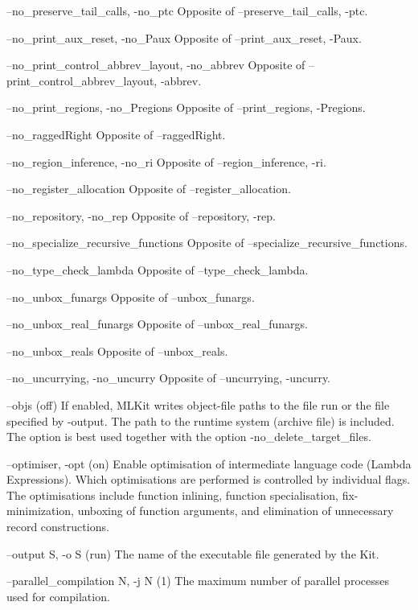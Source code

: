 \documentclass[12pt]{book}
\begin{document}
\begin{scriptcode}
--no_preserve_tail_calls, -no_ptc
     Opposite of --preserve_tail_calls, -ptc.

--no_print_aux_reset, -no_Paux
     Opposite of --print_aux_reset, -Paux.

--no_print_control_abbrev_layout, -no_abbrev
     Opposite of --print_control_abbrev_layout, -abbrev.

--no_print_regions, -no_Pregions
     Opposite of --print_regions, -Pregions.

--no_raggedRight
     Opposite of --raggedRight.

--no_region_inference, -no_ri
     Opposite of --region_inference, -ri.

--no_register_allocation
     Opposite of --register_allocation.

--no_repository, -no_rep
     Opposite of --repository, -rep.

--no_specialize_recursive_functions
     Opposite of --specialize_recursive_functions.

--no_type_check_lambda
     Opposite of --type_check_lambda.

--no_unbox_funargs
     Opposite of --unbox_funargs.

--no_unbox_real_funargs
     Opposite of --unbox_real_funargs.

--no_unbox_reals
     Opposite of --unbox_reals.

--no_uncurrying, -no_uncurry
     Opposite of --uncurrying, -uncurry.

--objs                                                   (off)
     If enabled, MLKit writes object-file paths to the file
     run or the file specified by -output. The path
     to the runtime system (archive file) is included. The
     option is best used together with the option
     -no_delete_target_files.

--optimiser, -opt                                         (on)
     Enable optimisation of intermediate language code
     (Lambda Expressions). Which optimisations are performed
     is controlled by individual flags. The optimisations
     include function inlining, function specialisation,
     fix-minimization, unboxing of function arguments, and
     elimination of unnecessary record constructions.

--output S, -o S                                         (run)
     The name of the executable file generated by
     the Kit.

--parallel_compilation N, -j N                             (1)
     The maximum number of parallel processes used
     for compilation.


\end{scriptcode}
\end{document}
